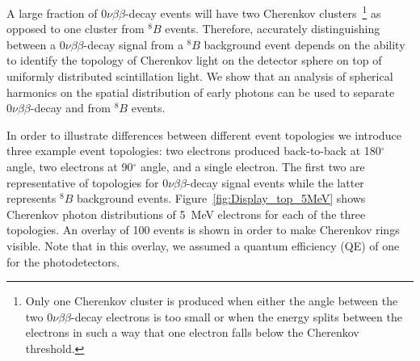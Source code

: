 \documentclass[12pt,twoside,letterpaper]{article}
\newcommand{\vbb}{0\nu\beta\beta}
\newcommand{\B}{^{8}B}
\begin{document}
A large fraction of $\vbb$-decay events will have two Cherenkov clusters~\footnote{Only one Cherenkov cluster is produced when either the angle between the two $\vbb$-decay electrons is too small or when the energy splits between the electrons in such a way that one electron falls below the Cherenkov threshold.} as opposed to one cluster from $\B$ events. Therefore, accurately distinguishing between a $\vbb$-decay signal from a $\B$ background event depends on the ability to identify the topology of Cherenkov light on the detector sphere on top of uniformly distributed scintillation light. We show that an analysis of spherical harmonics on the spatial distribution of early photons can be used to separate $\vbb$-decay and from $\B$ events.




In order to illustrate differences between different event topologies we introduce three example event topologies: two electrons produced back-to-back at 180$^{\circ}$ angle, two electrons at 90$^{\circ}$ angle, and a single electron. The first two are representative of topologies for $\vbb$-decay signal events while the latter represents $\B$ background events. Figure~\ref{fig:Display_top_5MeV} shows Cherenkov photon distributions of 5~MeV electrons for each of the three topologies. An overlay of 100 events is shown in order to make Cherenkov rings visible. Note that in this overlay, we assumed a quantum efficiency (QE) of one for the photodetectors.
\end{document}
